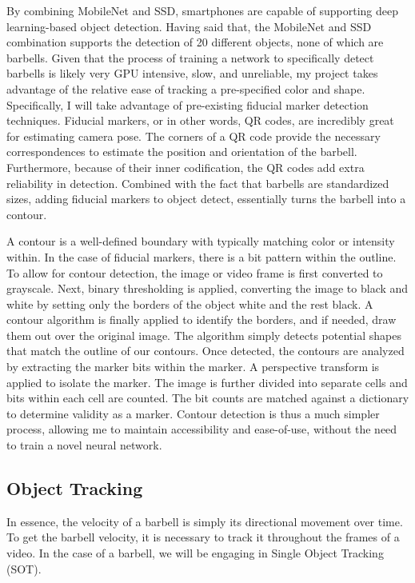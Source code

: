 \documentclass[10pt,twocolumn]{article}
\begin{document}
By combining MobileNet and SSD, smartphones are capable of supporting deep learning-based object detection.
Having said that, the MobileNet and SSD combination supports the detection of 20 different objects, none of which are barbells.
Given that the process of training a network to specifically detect barbells is likely very GPU intensive, slow, and unreliable, my project takes advantage of the relative ease of tracking a pre-specified color and shape.
Specifically, I will take advantage of pre-existing fiducial marker detection techniques. 
Fiducial markers, or in other words, QR codes, are incredibly great for estimating camera pose.
The corners of a QR code provide the necessary correspondences to estimate the position and orientation of the barbell.
Furthermore, because of their inner codification, the QR codes add extra reliability in detection.
Combined with the fact that barbells are standardized sizes, adding fiducial markers to object detect, essentially turns the barbell into a contour. \par

A contour is a well-defined boundary with typically matching color or intensity within.
In the case of fiducial markers, there is a bit pattern within the outline.
To allow for contour detection, the image or video frame is first converted to grayscale.
Next, binary thresholding is applied, converting the image to black and white by setting only the borders of the object white and the rest black.
A contour algorithm is finally applied to identify the borders, and if needed, draw them out over the original image.
The algorithm simply detects potential shapes that match the outline of our contours.
Once detected, the contours are analyzed by extracting the marker bits within the marker.
A perspective transform is applied to isolate the marker.
The image is further divided into separate cells and bits within each cell are counted.
The bit counts are matched against a dictionary to determine validity as a marker.
Contour detection is thus a much simpler process, allowing me to maintain accessibility and ease-of-use, without the need to train a novel neural network. \par

\subsection{Object Tracking}
In essence, the velocity of a barbell is simply its directional movement over time.
To get the barbell velocity, it is necessary to track it throughout the frames of a video.
In the case of a barbell, we will be engaging in Single Object Tracking (SOT). \par
\end{document}
